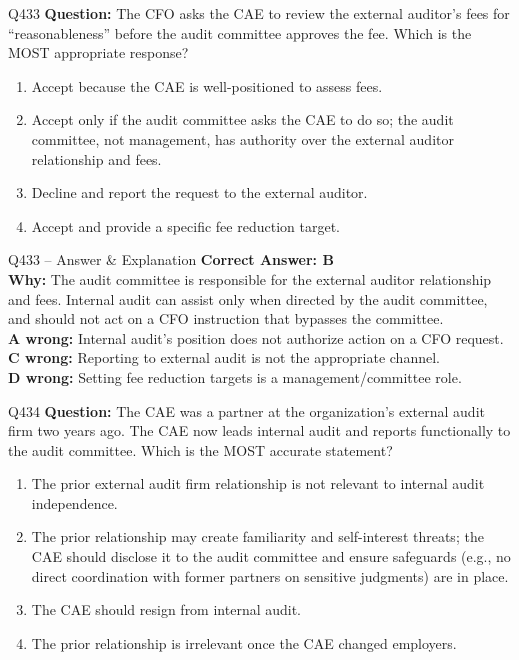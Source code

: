 \documentclass[aspectratio=169,10pt]{beamer}
\begin{document}
	\begin{frame}[t]{Q433}
		\small
		\textbf{Question:} The CFO asks the CAE to review the external auditor's fees for ``reasonableness'' before the audit committee approves the fee. Which is the MOST appropriate response?
		\begin{enumerate}[label=\Alph*.,itemsep=1pt,topsep=2pt]
			\item Accept because the CAE is well-positioned to assess fees.
			\item Accept only if the audit committee asks the CAE to do so; the audit committee, not management, has authority over the external auditor relationship and fees.
			\item Decline and report the request to the external auditor.
			\item Accept and provide a specific fee reduction target.
		\end{enumerate}
	\end{frame}
	
	\begin{frame}[t]{Q433 -- Answer \& Explanation}
		\small
		\textbf{Correct Answer: B} \\[4pt]
		\textbf{Why:} The audit committee is responsible for the external auditor relationship and fees. Internal audit can assist only when directed by the audit committee, and should not act on a CFO instruction that bypasses the committee. \\[4pt]
		\textbf{A wrong:} Internal audit's position does not authorize action on a CFO request. \\[2pt]
		\textbf{C wrong:} Reporting to external audit is not the appropriate channel. \\[2pt]
		\textbf{D wrong:} Setting fee reduction targets is a management/committee role.
	\end{frame}
	
	\begin{frame}[t]{Q434}
		\small
		\textbf{Question:} The CAE was a partner at the organization's external audit firm two years ago. The CAE now leads internal audit and reports functionally to the audit committee. Which is the MOST accurate statement?
		\begin{enumerate}[label=\Alph*.,itemsep=1pt,topsep=2pt]
			\item The prior external audit firm relationship is not relevant to internal audit independence.
			\item The prior relationship may create familiarity and self-interest threats; the CAE should disclose it to the audit committee and ensure safeguards (e.g., no direct coordination with former partners on sensitive judgments) are in place.
			\item The CAE should resign from internal audit.
			\item The prior relationship is irrelevant once the CAE changed employers.
		\end{enumerate}
	\end{frame}
	
\end{document}
